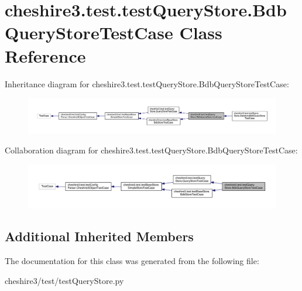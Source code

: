 \hypertarget{classcheshire3_1_1test_1_1test_query_store_1_1_bdb_query_store_test_case}{\section{cheshire3.\-test.\-test\-Query\-Store.\-Bdb\-Query\-Store\-Test\-Case Class Reference}
\label{classcheshire3_1_1test_1_1test_query_store_1_1_bdb_query_store_test_case}
}


Inheritance diagram for cheshire3.\-test.\-test\-Query\-Store.\-Bdb\-Query\-Store\-Test\-Case\-:
\nopagebreak
\begin{figure}[H]
\begin{center}
\leavevmode
\includegraphics[width=350pt]{classcheshire3_1_1test_1_1test_query_store_1_1_bdb_query_store_test_case__inherit__graph}
\end{center}
\end{figure}


Collaboration diagram for cheshire3.\-test.\-test\-Query\-Store.\-Bdb\-Query\-Store\-Test\-Case\-:
\nopagebreak
\begin{figure}[H]
\begin{center}
\leavevmode
\includegraphics[width=350pt]{classcheshire3_1_1test_1_1test_query_store_1_1_bdb_query_store_test_case__coll__graph}
\end{center}
\end{figure}
\subsection*{Additional Inherited Members}


The documentation for this class was generated from the following file\-:\begin{DoxyCompactItemize}
\item 
cheshire3/test/test\-Query\-Store.\-py\end{DoxyCompactItemize}
